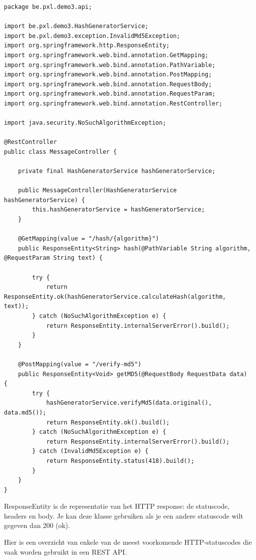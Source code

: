 \begin{lstlisting}
package be.pxl.demo3.api;

import be.pxl.demo3.HashGeneratorService;
import be.pxl.demo3.exception.InvalidMd5Exception;
import org.springframework.http.ResponseEntity;
import org.springframework.web.bind.annotation.GetMapping;
import org.springframework.web.bind.annotation.PathVariable;
import org.springframework.web.bind.annotation.PostMapping;
import org.springframework.web.bind.annotation.RequestBody;
import org.springframework.web.bind.annotation.RequestParam;
import org.springframework.web.bind.annotation.RestController;

import java.security.NoSuchAlgorithmException;

@RestController
public class MessageController {

	private final HashGeneratorService hashGeneratorService;

	public MessageController(HashGeneratorService hashGeneratorService) {
		this.hashGeneratorService = hashGeneratorService;
	}

	@GetMapping(value = "/hash/{algorithm}")
	public ResponseEntity<String> hash(@PathVariable String algorithm, @RequestParam String text) {

		try {
			return ResponseEntity.ok(hashGeneratorService.calculateHash(algorithm, text));
		} catch (NoSuchAlgorithmException e) {
			return ResponseEntity.internalServerError().build();
		}
	}

	@PostMapping(value = "/verify-md5")
	public ResponseEntity<Void> getMD5(@RequestBody RequestData data) {
		try {
			hashGeneratorService.verifyMd5(data.original(), data.md5());
			return ResponseEntity.ok().build();
		} catch (NoSuchAlgorithmException e) {
			return ResponseEntity.internalServerError().build();
		} catch (InvalidMd5Exception e) {
			return ResponseEntity.status(418).build();
		}
	}
}

\end{lstlisting}

ResponseEntity is de representatie van het HTTP response: de statuscode, headers en body.  Je kan deze klasse gebruiken als je een andere statuscode wilt gegeven dan 200 (ok).

Hier is een overzicht van enkele van de meest voorkomende HTTP-statuscodes die vaak worden gebruikt in een REST API.

